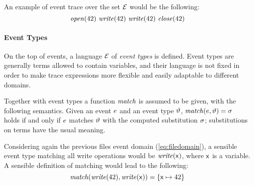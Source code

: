 An example of event trace over the set \(\mathcal{E}\) would be the following:
\begin{equation} \label{eq:trace}
	\mathit{open}(42)\ \mathit{write}(42)\ \mathit{write}(42)\ \mathit{close}(42)
\end{equation}

\paragraph{Event Types}
On the top of events, a language \(\mathcal{E}\) of \emph{event types} is defined.
Event types are generally terms allowed to contain variables, and their language is not fixed in order to make trace expressions more flexible and easily adaptable to different domains.

Together with event types a function \(\mathit{match}\) is assumed to be given, with the following semantics.
Given an event \(e\) and an event type \(\vartheta\), \(\mathit{match}(e, \vartheta) = \sigma\) holds if and only if \(e\) matches \(\vartheta\) with the computed substitution \(\sigma\); substitutions on terms have the usual meaning.

Considering again the previous files event domain (\ref{eq:filedomain}), a sensible event type matching all write operations would be \(\mathit{write}(\mathsf{x})\), where \(\mathsf{x}\) is a variable.
A sensible definition of matching would lead to the following:
\[ \mathit{match}(\mathit{write}(42), \mathit{write}(\mathsf{x})) = \{ \mathsf{x} \mapsto 42 \} \]


